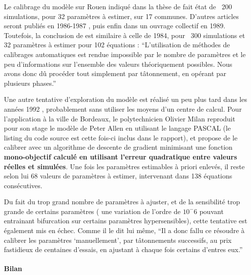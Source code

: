 Le calibrage du modèle sur Rouen indiqué dans la thèse de \autocites[348,354]{Sanders1984}{Sanders1985} fait état de ~200 simulations, pour 32 paramètres à estimer, sur 17 communes. D'autres articles seront publiés en 1986-1987 \autocites{Pumain1986,Pumain1987}, puis enfin dans un ouvrage collectif en 1989. Toutefois, la conclusion de \textcite[112]{Pumain1989} est similaire à celle de 1984, pour ~300 simulations et 32 paramètres à estimer pour 102 équations : \enquote{L’utilisation de méthodes de calibrages automatiques est rendue impossible par le nombre de paramètres et le peu d’informations sur l’ensemble des valeurs théoriquement possibles. Nous avons donc dû procéder tout simplement par tâtonnement, en opérant par plusieurs phases.}

Une autre tentative d'exploration du modèle est réalisé un peu plus tard dans les années 1992 \autocite{Milan1992}, probablement sans utiliser les moyens d'un centre de calcul. Pour l'application à la ville de Bordeaux, le polytechnicien Olivier Milan reproduit \autocite{Wilensky2007a} pour son stage le modèle de Peter Allen en utilisant le langage PASCAL (le listing du code source est cette fois-ci inclus dans le rapport), et propose de le calibrer avec un algorithme de descente de gradient minimisant une fonction \textbf{mono-objectif calculé en utilisant l'erreur quadratique entre valeurs réelles et simulées}. Une fois les paramètres estimables à priori enlevés, il reste selon lui 68 valeurs de paramètres à estimer, intervenant dans 138 équations consécutives.

Du fait du trop grand nombre de paramètres à ajuster, et de la sensibilité trop grande de certains paramètres ( une variation de l'ordre de $10^-6$ pouvant entrainant bifurcation sur certains paramètres hypersensibles), cette tentative est également mis en échec.  Comme il le dit lui même, \enquote{Il a donc fallu ce résoudre à calibrer les paramètres \enquote{manuellement}, par tâtonnements successifs, au prix fastidieux de centaines d'essais, en ajustant à chaque fois certains d'entres eux.}  %

\paragraph{Bilan}

